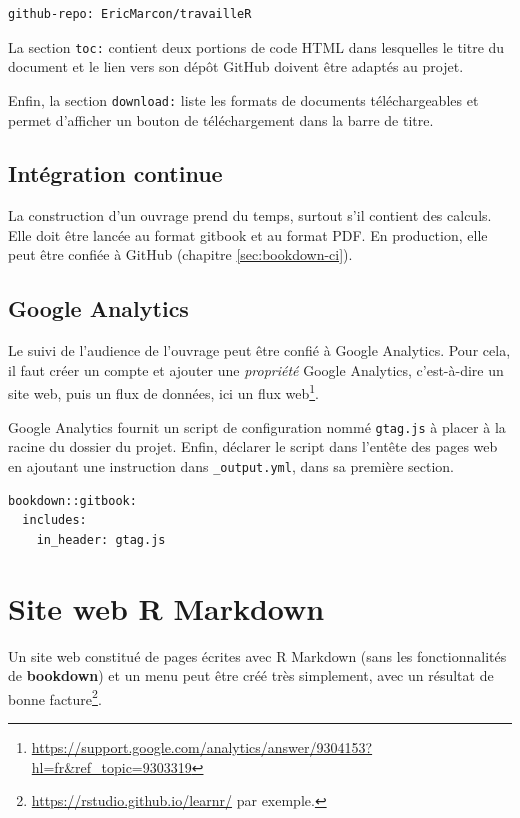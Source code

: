 \documentclass[
  12pt,
  french,
  a4paper,
  extrafontsizes,onecolumn,openright
  ]{memoir}
\begin{document}
\begin{verbatim}
github-repo: EricMarcon/travailleR
\end{verbatim}

La section \texttt{toc:} contient deux portions de code HTML dans lesquelles le titre du document et le lien vers son dépôt GitHub doivent être adaptés au projet.

Enfin, la section \texttt{download:} liste les formats de documents téléchargeables et permet d'afficher un bouton de téléchargement dans la barre de titre.

\subsection{Intégration continue}\label{sec:rediger-ouvrage-ci}

La construction d'un ouvrage prend du temps, surtout s'il contient des calculs.
Elle doit être lancée au format gitbook et au format PDF.
En production, elle peut être confiée à GitHub (chapitre \ref{sec:bookdown-ci}).

\subsection{Google Analytics}\label{google-analytics}

Le suivi de l'audience de l'ouvrage peut être confié à Google Analytics.
Pour cela, il faut créer un compte et ajouter une \emph{propriété} Google Analytics, c'est-à-dire un site web, puis un flux de données, ici un flux web\footnote{\url{https://support.google.com/analytics/answer/9304153?hl=fr&ref_topic=9303319}}.

Google Analytics fournit un script de configuration nommé \texttt{gtag.js} à placer à la racine du dossier du projet.
Enfin, déclarer le script dans l'entête des pages web en ajoutant une instruction dans \texttt{\_output.yml}, dans sa première section.

\begin{verbatim}
bookdown::gitbook:
  includes:
    in_header: gtag.js
\end{verbatim}

\section{Site web R Markdown}\label{site-web-r-markdown}

Un site web constitué de pages écrites avec R Markdown (sans les fonctionnalités de \textbf{bookdown}) et un menu peut être créé très simplement, avec un résultat de bonne facture\footnote{\url{https://rstudio.github.io/learnr/} par exemple.}.
\end{document}
